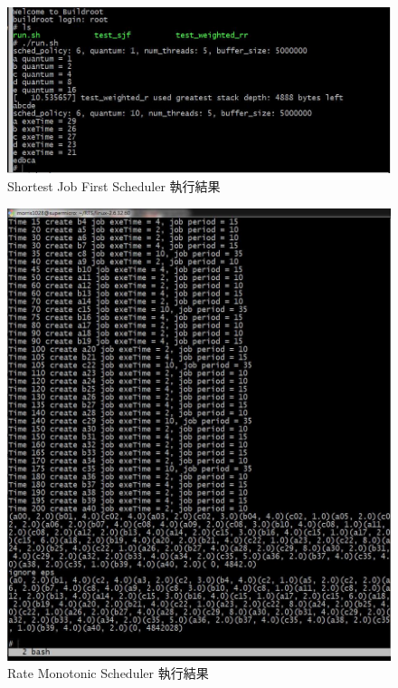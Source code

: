 \documentclass{res}
\begin{document}
\begin{resume}
\begin{figure}[htp]
    \begin{center}
        \includegraphics[width=400pt]{images/exp-sjf.jpg}
        \caption{Shortest Job First Scheduler 執行結果}
        \label{fig: result}
    \end{center}
\end{figure}

\begin{figure}[htp]
    \begin{center}
        \includegraphics[width=400pt]{images/exp-rms.jpg}
        \caption{Rate Monotonic Scheduler 執行結果}
        \label{fig: result}
    \end{center}
\end{figure}

\vspace*{.1in} 

\end{resume}
\end{document}
